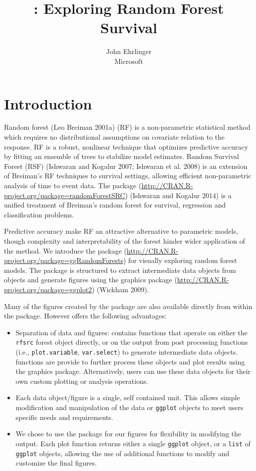 \documentclass[article]{jss}
\author{
John Ehrlinger\\Microsoft
}
\title{\pkg{ggRandomForests}: Exploring Random Forest Survival}
\begin{document}
\section{Introduction}\label{introduction}

Random forest (Leo Breiman 2001a) (RF) is a non-parametric statistical
method which requires no distributional assumptions on covariate
relation to the response. RF is a robust, nonlinear technique that
optimizes predictive accuracy by fitting an ensemble of trees to
stabilize model estimates. Random Survival Forest (RSF) (Ishwaran and
Kogalur 2007; Ishwaran et al. 2008) is an extension of Breiman's RF
techniques to survival settings, allowing efficient non-parametric
analysis of time to event data. The  package
(\url{http://CRAN.R-project.org/package=randomForestSRC}) (Ishwaran and
Kogalur 2014) is a unified treatment of Breiman's random forest for
survival, regression and classification problems.

Predictive accuracy make RF an attractive alternative to parametric
models, though complexity and interpretability of the forest hinder
wider application of the method. We introduce the 
package (\url{http://CRAN.R-project.org/package=ggRandomForests}) for
visually exploring random forest models. The 
package is structured to extract intermediate data objects from
 objects and generate figures using the
 graphics package
(\url{http://CRAN.R-project.org/package=ggplot2}) (Wickham 2009).

Many of the figures created by the  package are
also available directly from within the  package.
However  offers the following advantages:

\begin{itemize}
\item
  Separation of data and figures:  contains
  functions that operate on either the \texttt{rfsrc} forest object
  directly, or on the output from  post processing
  functions (i.e., \texttt{plot.variable}, \texttt{var.select}) to
  generate intermediate  data objects.
   functions are provide to further process these
  objects and plot results using the  graphics package.
  Alternatively, users can use these data objects for their own custom
  plotting or analysis operations.
\item
  Each data object/figure is a single, self contained unit. This allows
  simple modification and manipulation of the data or \texttt{ggplot}
  objects to meet users specific needs and requirements.
\item
  We chose to use the  package for our figures for
  flexibility in modifying the output. Each  plot
  function returns either a single \texttt{ggplot} object, or a
  \texttt{list} of \texttt{ggplot} objects, allowing the use of
  additional  functions to modify and customize the final
  figures.
\end{itemize}
\end{document}
